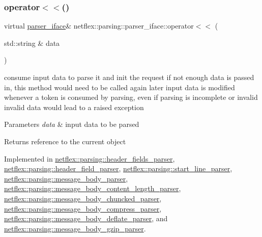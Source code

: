 \subsubsection{\texorpdfstring{operator$<$$<$()}{operator<<()}}
{\footnotesize\ttfamily virtual \hyperlink{classnetflex_1_1parsing_1_1parser__iface}{parser\+\_\+iface}\& netflex\+::parsing\+::parser\+\_\+iface\+::operator$<$$<$ (\begin{DoxyParamCaption}\item[{std\+::string \&}]{data }\end{DoxyParamCaption})\hspace{0.3cm}{\ttfamily [pure virtual]}}

consume input data to parse it and init the request if not enough data is passed in, this method would need to be called again later input data is modified whenever a token is consumed by parsing, even if parsing is incomplete or invalid invalid data would lead to a raised exception


\begin{DoxyParams}{Parameters}
{\em data} & input data to be parsed \\
\hline
\end{DoxyParams}
\begin{DoxyReturn}{Returns}
reference to the current object 
\end{DoxyReturn}


Implemented in \hyperlink{classnetflex_1_1parsing_1_1header__fields__parser_a4ba3f5dad38f3f9ef9bf3632f02d4111}{netflex\+::parsing\+::header\+\_\+fields\+\_\+parser}, \hyperlink{classnetflex_1_1parsing_1_1header__field__parser_a9b8f37ee50747394ff9740f36b6ac150}{netflex\+::parsing\+::header\+\_\+field\+\_\+parser}, \hyperlink{classnetflex_1_1parsing_1_1start__line__parser_a9a573ace2b0c41171e5dda3c16fa71e8}{netflex\+::parsing\+::start\+\_\+line\+\_\+parser}, \hyperlink{classnetflex_1_1parsing_1_1message__body__parser_a891c157d04d1fc59c1524672c4574570}{netflex\+::parsing\+::message\+\_\+body\+\_\+parser}, \hyperlink{classnetflex_1_1parsing_1_1message__body__content__length__parser_aedd5e9afda1868496de8c69c8ef0eae2}{netflex\+::parsing\+::message\+\_\+body\+\_\+content\+\_\+length\+\_\+parser}, \hyperlink{classnetflex_1_1parsing_1_1message__body__chuncked__parser_a18d0ab86d63bb22fb40663d06fcb12e1}{netflex\+::parsing\+::message\+\_\+body\+\_\+chuncked\+\_\+parser}, \hyperlink{classnetflex_1_1parsing_1_1message__body__compress__parser_ae8a77a83553e646915d0eed3ef25684c}{netflex\+::parsing\+::message\+\_\+body\+\_\+compress\+\_\+parser}, \hyperlink{classnetflex_1_1parsing_1_1message__body__deflate__parser_ad307d37f712b3e425bb2535f88546791}{netflex\+::parsing\+::message\+\_\+body\+\_\+deflate\+\_\+parser}, and \hyperlink{classnetflex_1_1parsing_1_1message__body__gzip__parser_a5206f23709657035b665238966a5cf13}{netflex\+::parsing\+::message\+\_\+body\+\_\+gzip\+\_\+parser}.




